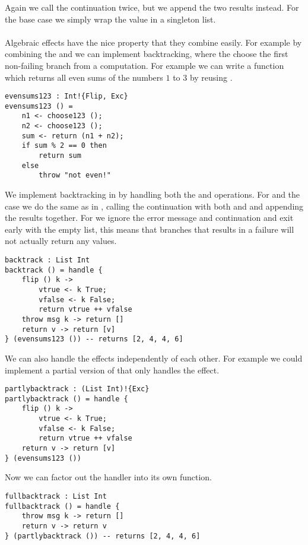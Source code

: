 {Again we call the continuation  twice, but we append the two results instead.
For the  base case we simply wrap the value in a singleton list.
\\\\
Algebraic effects have the nice property that they combine easily.
For example by combining the  and  we can implement backtracking, where the choose the first non-failing branch from a computation. For example we can write a function which returns all even sums of the numbers $1$ to $3$ by reusing .

\begin{verbatim}
evensums123 : Int!{Flip, Exc}
evensums123 () =
	n1 <- choose123 ();
	n2 <- choose123 ();
	sum <- return (n1 + n2);
	if sum % 2 == 0 then
		return sum
	else
		throw "not even!"
\end{verbatim}

We implement backtracking in  by handling both the  and  operations. For  and the  case we do the same as in , calling the continuation  with both  and  and appending the results together. For  we ignore the error message and continuation and exit early with the empty list, this means that branches that results in a failure will not actually return any values.

\begin{verbatim}
backtrack : List Int
backtrack () = handle {
	flip () k ->
		vtrue <- k True;
		vfalse <- k False;
		return vtrue ++ vfalse
	throw msg k -> return []
	return v -> return [v]
} (evensums123 ()) -- returns [2, 4, 4, 6]
\end{verbatim}

We can also handle the effects independently of each other. For example we could implement a partial version of  that only handles the  effect.

\begin{verbatim}
partlybacktrack : (List Int)!{Exc}
partlybacktrack () = handle {
	flip () k ->
		vtrue <- k True;
		vfalse <- k False;
		return vtrue ++ vfalse
	return v -> return [v]
} (evensums123 ())
\end{verbatim}

Now we can factor out the  handler into its own function.

\begin{verbatim}
fullbacktrack : List Int
fullbacktrack () = handle {
	throw msg k -> return []
	return v -> return v
} (partlybacktrack ()) -- returns [2, 4, 4, 6]
\end{verbatim}

}
